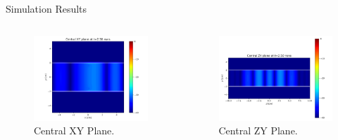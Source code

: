 \documentclass{beamer}
\begin{document}
\begin{frame}{Simulation Results}

  \begin{columns}
    
    \begin{column}{0.5\textwidth}
      
      \begin{figure}[H]
        \centering
        \includegraphics[width=\textwidth]{../contents/central_xy_plane.png}
        \caption{Central XY Plane.}
      \end{figure}

    \end{column}

    \begin{column}{0.5\textwidth}
      
      \begin{figure}[H]
        \centering
        \includegraphics[width=\textwidth]{../contents/central_zy_plane.png}
        \caption{Central ZY Plane.}
      \end{figure}

    \end{column}

  \end{columns}

\end{frame}
\end{document}
